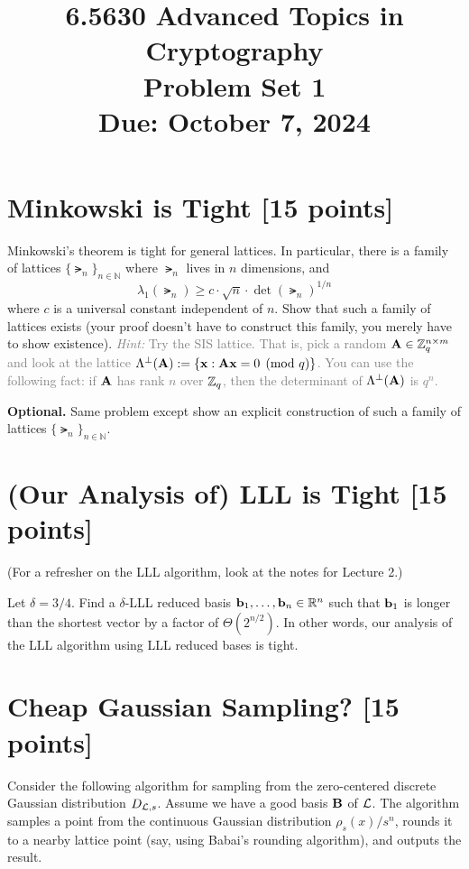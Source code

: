 \documentclass[11pt]{article}
\title{\textbf{6.5630 Advanced Topics in Cryptography} \\ Problem Set 1 \\ Due: October 7, 2024}
\author{}
\date{}
\begin{document}
\maketitle


\section{Minkowski is Tight [15 points]}
Minkowski's theorem is tight for general lattices. In particular, there is a family of lattices $\{\lat_n\}_{n\in\mathbb{N}}$ where $\lat_n$ lives in $n$ dimensions, and
\[ \lambda_1(\lat_n) \geq c\cdot \sqrt{n} \cdot \det(\lat_n)^{1/n} \]
where $c$ is a universal constant independent of $n$.
Show that such a family of lattices exists (your proof doesn't have to construct this family, you merely have to show existence). \textcolor{gray}{{\em Hint:} Try the SIS lattice. That is, pick a random $\mathbf{A} \in {\mathbb Z}_q^{n\times m}$ and look at the lattice $\Lambda^{\perp}(\mathbf{A}) := \{\mathbf{{x}}: \mathbf{A} \mathbf{{x}} = 0 \pmod{q}\}$. You can use the following fact:  if $\mathbf{A}$ has rank $n$ over ${\mathbb Z}_q$, then the determinant of $\Lambda^{\perp}(\mathbf{A})$ is $q^{n}$.}

\medskip\noindent
\textbf{Optional.} Same problem except show an explicit construction of such a family of lattices $\{\lat_n\}_{n\in\mathbb{N}}$.


\section{(Our Analysis of) LLL is Tight [15 points]}
(For a refresher on the LLL algorithm, look at the notes for Lecture 2.)

\medskip\noindent
Let $\delta = 3/4$. Find a $\delta$-LLL reduced basis $\mathbf{{b}}_1,\ldots,\mathbf{{b}}_n \in \mathbb{R}^n$  such that $\mathbf{{b}}_1$ is longer than the shortest vector by a factor of $\Theta(2^{n/2})$. In other words, our analysis of the LLL algorithm using LLL reduced bases is tight.



\section{Cheap Gaussian Sampling? [15 points]}

Consider the following algorithm for sampling from the zero-centered discrete Gaussian distribution $D_{\mathcal{L},s}$. Assume we have a good basis $\mathbf{B}$ of $\mathcal{L}$. The algorithm samples a point from the continuous Gaussian distribution $\rho_{s}(x)/s^n$, rounds it to a nearby lattice point (say, using Babai’s rounding algorithm), and outputs
the result. 
\end{document}
